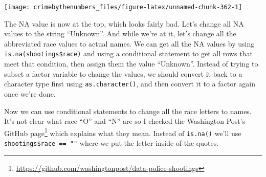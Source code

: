 \documentclass[
]{krantz}
\makeatletter
\newenvironment{Shaded}{\begin{snugshade}}{\end{snugshade}}
\newcommand{\AttributeTok}[1]{\textcolor[rgb]{0.61,0.61,0.61}{#1}}
\newcommand{\ConstantTok}[1]{\textcolor[rgb]{0,0,0}{#1}}
\newcommand{\FunctionTok}[1]{\textcolor[rgb]{0,0,0}{#1}}
\newcommand{\NormalTok}[1]{#1}
\newcommand{\OtherTok}[1]{\textcolor[rgb]{0.37,0.37,0.37}{#1}}
\newcommand{\SpecialCharTok}[1]{\textcolor[rgb]{0,0,0}{#1}}
\newcommand{\StringTok}[1]{\textcolor[rgb]{0.5,0.5,0.5}{#1}}
\renewcommand{\href}[2]{#2\footnote{\url{#1}}}
\newenvironment{kframe}{%
\medskip{}
\setlength{\fboxsep}{.8em}
 \def\at@end@of@kframe{}%
 \ifinner\ifhmode%
  \def\at@end@of@kframe{\end{minipage}}%
  \begin{minipage}{\columnwidth}%
 \fi\fi%
 \def\FrameCommand##1{\hskip\@totalleftmargin \hskip-\fboxsep
 \colorbox{shadecolor}{##1}\hskip-\fboxsep
     \hskip-\linewidth \hskip-\@totalleftmargin \hskip\columnwidth}%
 \MakeFramed {\advance\hsize-\width
   \@totalleftmargin\z@ \linewidth\hsize
   \@setminipage}}%
 {\par\unskip\endMakeFramed%
 \at@end@of@kframe}
\renewenvironment{Shaded}{\begin{kframe}}{\end{kframe}}
\makeatother
\begin{document}
\begin{Shaded}
\end{Shaded}

\begin{center}\texttt{[image: crimebythenumbers\_files/figure-latex/unnamed-chunk-362-1]} \end{center}

The NA value is now at the top, which looks fairly bad.
Let's change all NA values to the string ``Unknown''. And
while we're at it, let's change all the abbreviated race
values to actual names. We can get all the NA values by
using \texttt{is.na(shootings\$race)} and using a
conditional statement to get all rows that meet that
condition, then assign them the value ``Unknown''. Instead
of trying to subset a factor variable to change the values,
we should convert it back to a character type first using
\texttt{as.character()}, and then convert it to a factor
again once we're done.

\begin{Shaded}
\end{Shaded}

Now we can use conditional statements to change all the race
letters to names. It's not clear what race ``O'' and ``N''
are so I checked the
\href{https://github.com/washingtonpost/data-police-shootings}{Washington
Post's GitHub page} which explains what they mean. Instead
of \texttt{is.na()} we'll use
\texttt{shootings\$race\ ==\ ""} where we put the letter
inside of the quotes.
\end{document}
